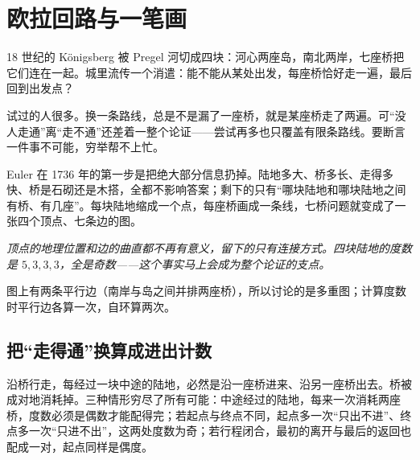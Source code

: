 \section{欧拉回路与一笔画}
\label{sec:04-Discrete-Mathematics/03-Graph-Theory/07}

18 世纪的 Königsberg 被 Pregel 河切成四块：河心两座岛，南北两岸，七座桥把它们连在一起。城里流传一个消遣：能不能从某处出发，每座桥恰好走一遍，最后回到出发点？

试过的人很多。换一条路线，总是不是漏了一座桥，就是某座桥走了两遍。可``没人走通''离``走不通''还差着一整个论证——尝试再多也只覆盖有限条路线。要断言一件事不可能，穷举帮不上忙。

Euler 在 1736 年的第一步是把绝大部分信息扔掉。陆地多大、桥多长、走得多快、桥是石砌还是木搭，全都不影响答案；剩下的只有``哪块陆地和哪块陆地之间有桥、有几座''。每块陆地缩成一个点，每座桥画成一条线，七桥问题就变成了一张四个顶点、七条边的图。

\begin{center}

\emph{顶点的地理位置和边的曲直都不再有意义，留下的只有连接方式。四块陆地的度数是 \(5,3,3,3\)，全是奇数——这个事实马上会成为整个论证的支点。}
\end{center}

图上有两条平行边（南岸与岛之间并排两座桥），所以讨论的是多重图；计算度数时平行边各算一次，自环算两次。

\subsection{把``走得通''换算成进出计数}

沿桥行走，每经过一块中途的陆地，必然是沿一座桥进来、沿另一座桥出去。桥被成对地消耗掉。三种情形穷尽了所有可能：中途经过的陆地，每来一次消耗两座桥，度数必须是偶数才能配得完；若起点与终点不同，起点多一次``只出不进''、终点多一次``只进不出''，这两处度数为奇；若行程闭合，最初的离开与最后的返回也配成一对，起点同样是偶度。

